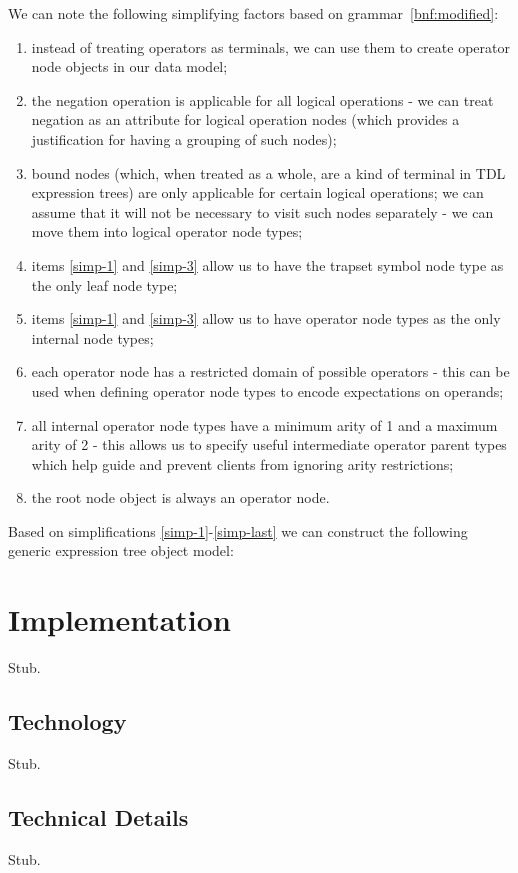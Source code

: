 \documentclass[12pt,oneside,a4paper,notitlepage]{report}
\begin{document}
	\par We can note the following simplifying factors based on grammar~\ref{bnf:modified}:
	\begin{enumerate}[label=\textbf{\arabic*.},ref=\textit{\arabic*.}]
		\item \label{simp-1} instead of treating operators as terminals, we can use them to create operator node objects in our data model;
		\item \label{simp-2} the negation operation is applicable for all logical operations - we can treat negation as an attribute for logical operation nodes (which provides a justification for having a grouping of such nodes);
		\item \label{simp-3} bound nodes (which, when treated as a whole, are a kind of terminal in TDL expression trees) are only applicable for certain logical operations; we can assume that it will not be necessary to visit such nodes separately - we can move them into logical operator node types;
		\item \label{simp-4} items \ref{simp-1} and \ref{simp-3} allow us to have the trapset symbol node type as the only leaf node type;
		\item \label{simp-5} items \ref{simp-1} and \ref{simp-3} allow us to have operator node types as the only internal node types;
		\item \label{simp-6} each operator node has a restricted domain of possible operators - this can be used when defining operator node types to encode expectations on operands;
		\item \label{simp-7} all internal operator node types have a minimum arity of 1 and a maximum arity of 2 - this allows us to specify useful intermediate operator parent types which help guide and prevent clients from ignoring arity restrictions;
		\item \label{simp-last} the root node object is always an operator node.
	\end{enumerate}


	\par Based on simplifications \ref{simp-1}-\ref{simp-last} we can construct the following generic expression tree object model:
	

	\section*{Implementation}
	\par Stub.

	\subsection*{Technology}
	\par Stub.

	\subsection*{Technical Details}
	\par Stub.

	\printbibliography[
		title=Sources
	]
\end{document}
